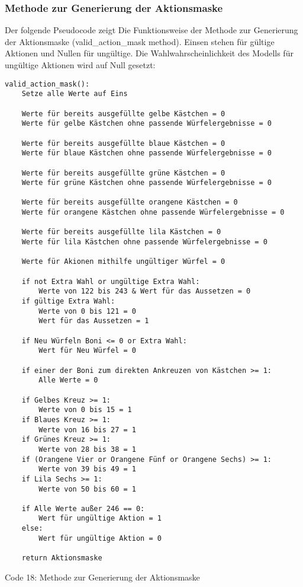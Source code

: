 \subsubsection{Methode zur Generierung der Aktionsmaske}
Der folgende Pseudocode zeigt Die Funktionsweise der Methode zur Generierung der Aktionsmaske (valid\_action\_mask method). Einsen stehen für gültige Aktionen und Nullen für ungültige. Die Wahlwahrscheinlichkeit des Modells für ungültige Aktionen wird auf Null gesetzt:
\vspace{0.5cm}
\begin{lstlisting}
valid_action_mask():
	Setze alle Werte auf Eins
	
	Werte für bereits ausgefüllte gelbe Kästchen = 0
	Werte für gelbe Kästchen ohne passende Würfelergebnisse = 0
	
	Werte für bereits ausgefüllte blaue Kästchen = 0
	Werte für blaue Kästchen ohne passende Würfelergebnisse = 0
	
	Werte für bereits ausgefüllte grüne Kästchen = 0
	Werte für grüne Kästchen ohne passende Würfelergebnisse = 0
	
	Werte für bereits ausgefüllte orangene Kästchen = 0
	Werte für orangene Kästchen ohne passende Würfelergebnisse = 0
	
	Werte für bereits ausgefüllte lila Kästchen = 0
	Werte für lila Kästchen ohne passende Würfelergebnisse = 0
	
	Werte für Akionen mithilfe ungültiger Würfel = 0
	
	if not Extra Wahl or ungültige Extra Wahl:
		Werte von 122 bis 243 & Wert für das Aussetzen = 0
	if gültige Extra Wahl:
		Werte von 0 bis 121 = 0
		Wert für das Aussetzen = 1
	
	if Neu Würfeln Boni <= 0 or Extra Wahl:
		Wert für Neu Würfel = 0
	
	if einer der Boni zum direkten Ankreuzen von Kästchen >= 1:
		Alle Werte = 0
	
	if Gelbes Kreuz >= 1:
		Werte von 0 bis 15 = 1
	if Blaues Kreuz >= 1:
		Werte von 16 bis 27 = 1
	if Grünes Kreuz >= 1:
		Werte von 28 bis 38 = 1
	if (Orangene Vier or Orangene Fünf or Orangene Sechs) >= 1:
		Werte von 39 bis 49 = 1
	if Lila Sechs >= 1:
		Werte von 50 bis 60 = 1
	
	if Alle Werte außer 246 == 0:
		Wert für ungültige Aktion = 1
	else:
		Wert für ungültige Aktion = 0
		
	return Aktionsmaske
\end{lstlisting}
Code 18: Methode zur Generierung der Aktionsmaske\\

